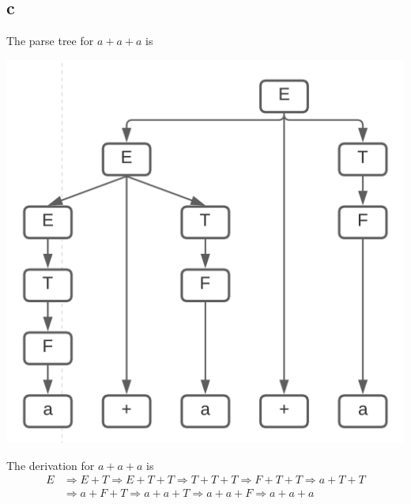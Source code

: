 \documentclass{article}
\begin{document}
\subsection*{c}
The parse tree for $a+a+a$ is
\begin{center}
    \includegraphics[scale=.65]{2.1.c.png}
\end{center}
The derivation for $a+a+a$ is
\begin{align*}
    E &\Rightarrow E+T \Rightarrow E + T+ T \Rightarrow T+T+T \Rightarrow F + T + T \Rightarrow a + T + T \\
    & \Rightarrow a + F + T \Rightarrow a + a + T \Rightarrow a + a + F \Rightarrow a+a+a
\end{align*}

\pagebreak
\end{document}
